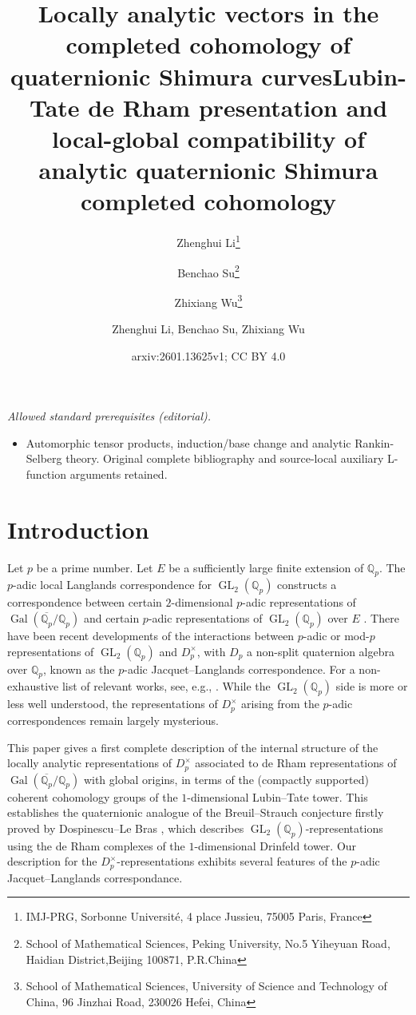 \documentclass{article}
\title{Locally analytic vectors in the completed cohomology of quaternionic Shimura curves}
\author{Zhenghui Li\footnote{IMJ-PRG, Sorbonne Universit\'e, 4 place Jussieu, 75005 Paris, France}\\
\and 
Benchao Su\footnote{School of Mathematical Sciences, Peking University, No.5 Yiheyuan Road, Haidian District,Beijing 100871, P.R.China}\\
\and
Zhixiang Wu\footnote{School of Mathematical Sciences, University of Science and Technology of China, 96 Jinzhai Road, 230026 Hefei, China}}
\date{}
\title{Lubin-Tate de Rham presentation and local-global compatibility of analytic quaternionic Shimura completed cohomology}
\author{Zhenghui Li, Benchao Su, Zhixiang Wu}
\date{arxiv:2601.13625v1; CC BY 4.0}
\theoremstyle{definition}
\def\bbQ{\mathbb{Q}}
\DeclareMathOperator{\Gal}{Gal}
\DeclareMathOperator{\GL}{GL}
\begin{document}
\maketitle
\noindent\textit{Allowed standard prerequisites (editorial).}\begin{itemize}
\item Automorphic tensor products, induction/base change and analytic Rankin-Selberg theory. Original complete bibliography and source-local auxiliary L-function arguments retained.
\end{itemize}\medskip
\section{Introduction}
Let $p$ be a prime number. Let $E$ be a sufficiently large finite extension of $\bbQ_p$. The $p$-adic local Langlands correspondence for $\GL_2(\bbQ_p)$ constructs a correspondence between certain $2$-dimensional $p$-adic representations of $\Gal(\overline{\bbQ_p}/\bbQ_p)$ and certain $p$-adic representations of $\GL_2(\bbQ_p)$ over $E$ \cite{breuil2010emerging,colmez2010representations,MR3272011}. There have been recent developments of the interactions between $p$-adic or mod-$p$ representations of $\GL_2(\bbQ_p)$ and $D_p^\times$, with $D_p$ a non-split quaternion algebra over $\bbQ_p$, known as the $p$-adic Jacquet--Langlands correspondence. For a non-exhaustive list of relevant works, see, e.g., \cite{Scholze2018LubinTate, ludwig2017quotient, pavskunas2022some,hansen2022padicsheavesclassifyingstacks,HuWang,hu2024some,dospinescu2024jacquetlanglandsfunctorpadiclocally}. While the $\GL_2(\bbQ_p)$ side is more or less well understood, the representations of $D_p^\times$ arising from the $p$-adic correspondences remain largely mysterious.

This paper gives a first complete description of the internal structure of the locally analytic representations of $D_p^{\times}$ associated to de Rham representations of $\Gal(\overline{\bbQ_p}/\bbQ_p)$ with global origins, in terms of the (compactly supported) coherent cohomology groups of the $1$-dimensional Lubin--Tate tower. This establishes the quaternionic analogue of the Breuil--Strauch conjecture firstly proved by Dospinescu--Le Bras \cite{DLB17}, which describes  $\GL_2(\bbQ_p)$-representations using the de Rham complexes of the $1$-dimensional Drinfeld tower. Our description for the $D_p^{\times}$-representations exhibits several features of the $p$-adic Jacquet--Langlands correspondance.
\end{document}
